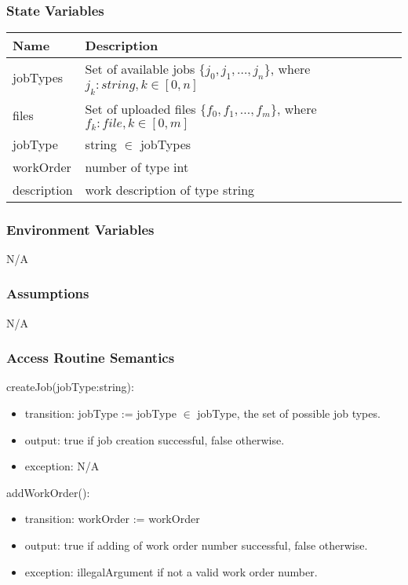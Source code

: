 \documentclass[12pt, titlepage]{article}
\begin{document}
\subsubsection{State Variables}

\begin{center}
  \begin{tabular}{p{4cm} p{12cm}}
    \hline
    \textbf{Name} & \textbf{Description} \\
    \hline
    jobTypes & Set of available jobs $\{j_0, j_1, ..., j_n\}$, where
    $j_k:string, k\in[0,n]$ \\
    files & Set of uploaded files $\{f_0, f_1, ..., f_m\}$, where
    $f_k:file, k\in[0,m]$ \\
    jobType & string $\in$ jobTypes \\
    workOrder & number of type int \\
    description & work description of type string \\
    \hline
  \end{tabular}
\end{center}

\subsubsection{Environment Variables}

N/A

\subsubsection{Assumptions}

N/A

\subsubsection{Access Routine Semantics}

\noindent createJob(jobType:string):
\begin{itemize}
  \item transition: jobType := jobType $\in$ jobType, the set of
    possible job types.
  \item output: true if job creation successful, false otherwise.
  \item exception: N/A
\end{itemize}

\noindent addWorkOrder():
\begin{itemize}
  \item transition: workOrder := workOrder
  \item output: true if adding of work order number successful, false otherwise.
  \item exception: illegalArgument if not a valid work order number.
\end{itemize}
\end{document}
